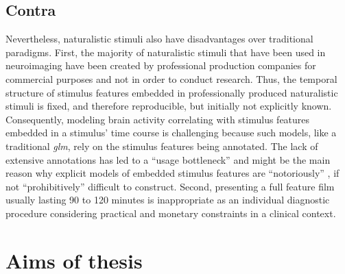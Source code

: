 \subsection{Contra}
Nevertheless, naturalistic stimuli also have disadvantages over traditional
paradigms.
First, the majority of naturalistic stimuli that have been used in neuroimaging
have been created by professional production companies for commercial purposes
and not in order to conduct research.
Thus, the temporal structure of stimulus features embedded in professionally
produced naturalistic stimuli is fixed, and therefore reproducible, but
initially not explicitly known.
Consequently, modeling brain activity correlating with stimulus features
embedded in a stimulus' time course is challenging
\citep{saarimaki2021naturalistic, simony2020analysis} because such models, like
a traditional \textit{\ac{glm}}, rely on the stimulus features being annotated.
The lack of extensive annotations has led to a ``usage bottleneck''
\citep{aliko2020naturalistic} and might be the main reason why explicit models
of embedded stimulus features are ``notoriously'' \citep{richard2019fast}, if
not ``prohibitively'' \citep{nastase2019measuring} difficult to construct.
Second, presenting a full feature film usually lasting 90 to 120 minutes is
inappropriate as an individual diagnostic procedure considering practical and
monetary constraints in a clinical context.


\section{Aims of thesis}


